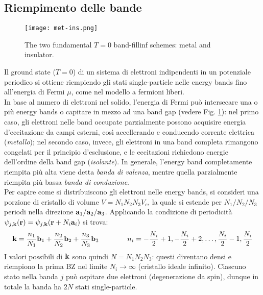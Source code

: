 \subsection{Riempimento delle bande}

\begin{figure}
	\centering
	\texttt{[image: met-ins.png]}
	\caption{The two fundamental $ T = 0 $ band-fillinf schemes: metal and insulator.}
	\label{met-ins}
\end{figure}

Il ground state ($ T = 0 $) di un sistema di elettroni indipendenti in un potenziale periodico si ottiene riempiendo gli stati single-particle nelle energy bands fino all'energia di Fermi $ \mu $, come nel modello a fermioni liberi. \\
In base al numero di elettroni nel solido, l'energia di Fermi può intersecare una o più energy bands o capitare in mezzo ad una band gap (vedere Fig. \ref{met-ins}): nel primo caso, gli elettroni nelle band occupate parzialmente possono acquisire energia d'eccitazione da campi esterni, così accellerando e conducendo corrente elettrica (\textit{metallo}); nel secondo caso, invece, gli elettroni in una band completa rimangono congelati per il principio d'esclusione, e le eccitazioni richiedono energie dell'ordine della band gap (\textit{isolante}). In generale, l'energy band completamente riempita più alta viene detta \textit{banda di valenza}, mentre quella parzialmente riempita più bassa \textit{banda di conduzione}. \\
Per capire come si distribuiscono gli elettroni nelle energy bands, si consideri una porzione di cristallo di volume $ V = N_1 N_2 N_3 V_c $, la quale si estende per $ N_1 / N_2 / N_3 $ periodi nella direzione $ \mathbf{a}_1 / \mathbf{a}_2 / \mathbf{a}_3 $. Applicando la condizione di periodicità $ \psi_{j,\mathbf{k}}(\mathbf{r}) = \psi_{j,\mathbf{k}}(\mathbf{r} + N_i \mathbf{a}_i) $ si trova:
\begin{equation}
	\mathbf{k} = \frac{n_1}{N_1} \mathbf{b}_1 + \frac{n_2}{N_2} \mathbf{b}_2 + \frac{n_3}{N_3} \mathbf{b}_3
	\qquad \qquad
	n_i = - \frac{N_i}{2} + 1 , - \frac{N_i}{2} + 2 , \dots , \frac{N_i}{2} -1 , \frac{N_i}{2}
	\label{eq:n-k}
\end{equation}
I valori possibili di $ \mathbf{k} $ sono quindi $ N = N_1 N_2 N_3 $: questi diventano densi e riempiono la prima BZ nel limite $ N_i \rightarrow \infty $ (cristallo ideale infinito). Ciascuno stato nella banda $ j $ può ospitare due elettroni (degenerazione da spin), dunque in totale la banda ha $ 2N $ stati single-particle.

